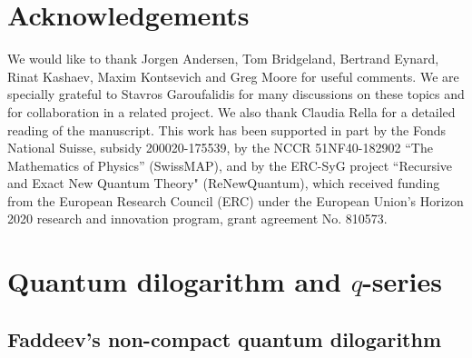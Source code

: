 \documentclass[a4paper,11pt]{article}
\theoremstyle{definition}
\begin{document}
\section*{Acknowledgements}
We would like to thank Jorgen Andersen, Tom Bridgeland, Bertrand Eynard, Rinat Kashaev, 
Maxim Kontsevich and Greg Moore for useful 
comments. We are specially grateful to Stavros Garoufalidis for many discussions on 
these topics and for collaboration 
in a related project. We also thank Claudia Rella for a detailed reading of the manuscript. 
This work has been supported in part by the Fonds National Suisse, 
subsidy 200020-175539, by the NCCR 51NF40-182902 ``The Mathematics of Physics'' (SwissMAP), 
and by the ERC-SyG project 
``Recursive and Exact New Quantum Theory" (ReNewQuantum), which 
received funding from the European Research Council (ERC) under the European 
Union's Horizon 2020 research and innovation program, 
grant agreement No. 810573.



\appendix

\section{Quantum dilogarithm and $q$-series}

\subsection{Faddeev's non-compact quantum dilogarithm}
\label{app-qd}
\end{document}
